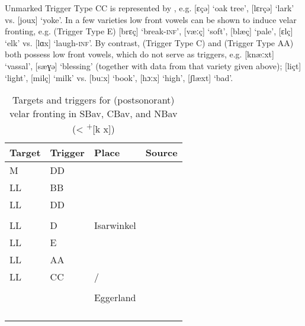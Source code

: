 Unmarked Trigger Type CC is represented by , e.g. [ɛçə] ‘oak tree’, [lɛrçə] ‘lark’ vs. [joux] ‘yoke’. In a few varieties low front vowels can be shown to induce velar fronting, e.g.  (Trigger Type E) [brɛç] ‘break-\textsc{inf}’, [væːç] ‘soft’, [blæç] ‘pale’, [ɛlç] ‘elk’ vs. [lɑx] ‘laugh-\textsc{inf}’. By contrast,  (Trigger Type C) and  (Trigger Type AA) both possess low front vowels, which do not serve as triggers, e.g.  [knæːxt] ‘vassal’, [sæɣə] ‘blessing’ (together with data from that variety given above);  [liçt] ‘light’, [milç] ‘milk’ vs. [buːx] ‘book’, [hɔːx] ‘high’, [ʃlæxt] ‘bad’.

\begin{table}
\small
\caption{Targets and triggers for (postsonorant) velar fronting in SBav, CBav, and NBav (< \textsuperscript{+}[k x])\label{tab:12.6}}
\begin{tabularx}{\textwidth}{llQQ}
\lsptoprule
Target & Trigger  & Place & Source\\
\midrule
M & DD &   & \citet{Götz1987}\\
LL & BB &   & \citet{Seemüller1908b}\\
LL & DD &   & \citet{Moosmüller1987}\\
  &    &   & \citet{Moosmüller1991}\\
LL & D & Isarwinkel & \citet{Maier1965}\\
LL & E &   & \citet{Dozauer1967}\\
LL & AA &   & \citet{Gladiator1971}\\
LL & CC &  /    & \citet{Siebs1906}       \\
   &    &                     &\citet{Gebhardt1907}      \\
   &    & Eggerland                        &\citet{Eichhorn1908}      \\
   &    &              &\citet{Mindl19241925}     \\
   &    &              &\citet{Hain1936}          \\
   &    &                   &\citet{Kufner1957}        \\
   &    &                       &\citet{Kufner1961}        \\

\end{tabularx}
\end{table}
